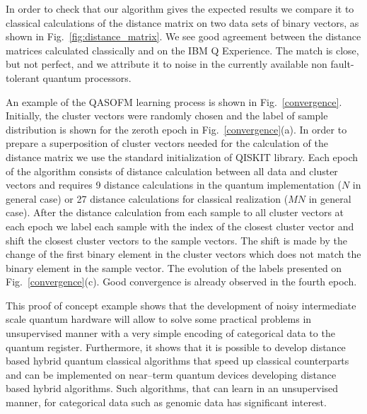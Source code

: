 \documentclass[pra,showkeys,twocolumn,showpacs]{revtex4-1}
\begin{document}
In order to check that our algorithm gives the expected results we compare it to classical calculations of the distance matrix on two data sets of binary vectors, as shown in Fig.~\ref{fig:distance_matrix}.
We see good agreement between the distance matrices calculated classically and on the IBM Q Experience.
The match is close, but not perfect, and we attribute it to noise in the currently available non fault-tolerant quantum processors.

An example of the QASOFM learning process is shown in Fig.~\ref{convergence}.
Initially, the cluster vectors were randomly chosen and the label of sample distribution is shown for the zeroth epoch in Fig.~\ref{convergence}(a). In order to prepare a superposition of cluster vectors needed for the calculation of the distance matrix we use the standard initialization of QISKIT\cite{qiskit} library.
Each epoch of the algorithm consists of distance calculation between all data and cluster vectors
and requires 9 distance calculations in the  quantum implementation ($N$ in general case)
or 27 distance calculations for classical realization
($MN$ in general case).
After the distance calculation from each sample to all cluster vectors at each epoch we label each sample with the index of the closest cluster vector
and shift the closest cluster vectors to the sample vectors.
The shift is made by the change of the first binary element in the cluster vectors which does not match the binary element in the sample vector.
The evolution of the labels presented on Fig.~\ref{convergence}(c).
Good convergence is already observed in the fourth epoch.

This proof of concept example shows that the development of noisy intermediate scale quantum hardware will allow to solve some practical problems in unsupervised manner with a very simple encoding of categorical data to the quantum register.
Furthermore, it shows that it is possible to develop distance based hybrid quantum classical algorithms
that speed up classical counterparts and can be implemented on near--term quantum devices
developing distance based hybrid algorithms. Such algorithms,
that can learn in an unsupervised manner, for categorical data such as genomic data has significant interest.
\end{document}
